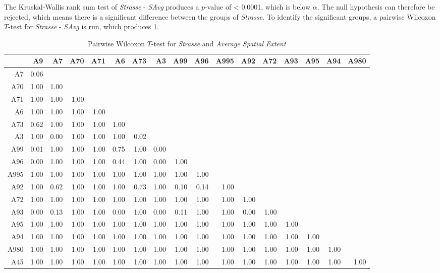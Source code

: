 The Kruskal-Wallis rank sum test of \textit{Strasse} - \textit{SAvg} produces a $p$-value of < 0.0001, which is below $\alpha$. The null hypothesis can therefore be rejected, which means there is a significant difference between the groups of \textit{Strasse}. To identify the significant groups, a pairwise Wilcoxon $T$-test for \textit{Strasse} - \textit{SAvg} is run, which produces \cref{tbl:wilcoxon_arbis_matched_Strasse_SAvg}. 
\begin{table}[ht!]
	\tiny
	\setlength{\tabcolsep}{4pt}
	\centering
  \begin{tabular}{rrrrrrrrrrrrrrrrr}
    \hline
         & A9 & A7 & A70 & A71 & A6 & A73 & A3 & A99 & A96 & A995 & A92 & A72 & A93 & A95 & A94 & A980 \\ 
    \hline
    A7   & 0.06 &  &  &  &  &  &  &  &  &  &  &  &  &  &  &  \\ 
    A70  & 1.00 & 1.00 &  &  &  &  &  &  &  &  &  &  &  &  &  &  \\ 
    A71  & 1.00 & 1.00 & 1.00 &  &  &  &  &  &  &  &  &  &  &  &  &  \\ 
    A6   & 1.00 & 1.00 & 1.00 & 1.00 &  &  &  &  &  &  &  &  &  &  &  &  \\ 
    A73  & 0.62 & 1.00 & 1.00 & 1.00 & 1.00 &  &  &  &  &  &  &  &  &  &  &  \\ 
    A3   & 1.00 & 0.00 & 1.00 & 1.00 & 1.00 & 0.02 &  &  &  &  &  &  &  &  &  &  \\ 
    A99  & 0.01 & 1.00 & 1.00 & 1.00 & 0.75 & 1.00 & 0.00 &  &  &  &  &  &  &  &  &  \\ 
    A96  & 0.00 & 1.00 & 1.00 & 1.00 & 0.44 & 1.00 & 0.00 & 1.00 &  &  &  &  &  &  &  &  \\ 
    A995 & 1.00 & 1.00 & 1.00 & 1.00 & 1.00 & 1.00 & 1.00 & 1.00 & 1.00 &  &  &  &  &  &  &  \\ 
    A92  & 1.00 & 0.62 & 1.00 & 1.00 & 1.00 & 0.73 & 1.00 & 0.10 & 0.14 & 1.00 &  &  &  &  &  &  \\ 
    A72  & 1.00 & 1.00 & 1.00 & 1.00 & 1.00 & 1.00 & 1.00 & 1.00 & 1.00 & 1.00 & 1.00 &  &  &  &  &  \\ 
    A93  & 0.00 & 0.13 & 1.00 & 1.00 & 0.00 & 1.00 & 0.00 & 0.11 & 1.00 & 1.00 & 0.00 & 1.00 &  &  &  &  \\ 
    A95  & 1.00 & 1.00 & 1.00 & 1.00 & 1.00 & 1.00 & 1.00 & 1.00 & 1.00 & 1.00 & 1.00 & 1.00 & 1.00 &  &  &  \\ 
    A94  & 1.00 & 1.00 & 1.00 & 1.00 & 1.00 & 1.00 & 1.00 & 1.00 & 1.00 & 1.00 & 1.00 & 1.00 & 1.00 & 1.00 &  &  \\ 
    A980 & 1.00 & 1.00 & 1.00 & 1.00 & 1.00 & 1.00 & 1.00 & 1.00 & 1.00 & 1.00 & 1.00 & 1.00 & 1.00 & 1.00 & 1.00 &  \\ 
    A45  & 1.00 & 1.00 & 1.00 & 1.00 & 1.00 & 1.00 & 1.00 & 1.00 & 1.00 & 1.00 & 1.00 & 1.00 & 1.00 & 1.00 & 1.00 & 1.00 \\ 
    \hline
  \end{tabular}
	\caption{Pairwise Wilcoxon $T$-test for \textit{Strasse} and \textit{Average Spatial Extent}}
	\label{tbl:wilcoxon_arbis_matched_Strasse_SAvg}
\end{table}
